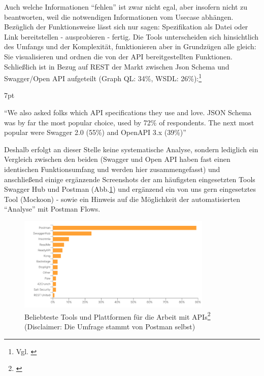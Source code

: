 \documentclass[notitlepage, hidelinks]{article}
\newenvironment{formal}{%
  \def\FrameCommand{%
    \hspace{1pt}%
    {\color{black}\vrule width 2pt}%
    {\color{formalshade}\vrule width 4pt}%
    \colorbox{formalshade}%
  }%
  \MakeFramed{\advance\hsize-\width\FrameRestore}%
  \noindent\hspace{-4.55pt}%
  \begin{adjustwidth}{}{7pt}%
  \vspace{2pt}\vspace{2pt}%
}
{%
  \vspace{2pt}\end{adjustwidth}\endMakeFramed%
}
\begin{document}
Auch welche Informationen ``fehlen'' ist zwar nicht egal, aber insofern nicht zu beantworten, weil die notwendigen Informationen vom Usecase abhängen. Bezüglich der Funktionsweise lässt sich nur sagen: Spezifikation als Datei oder Link bereitstellen - ausprobieren - fertig. Die Tools unterscheiden sich hinsichtlich des Umfangs und der Komplexität, funktionieren aber in Grundzügen alle gleich: Sie visualisieren und ordnen die von der API bereitgestellten Funktionen. Schließlich ist in Bezug auf REST der Markt zwischen Json Schema und Swagger/Open API aufgeteilt (Graph QL: 34\%, WSDL: 26\%):\footnote{Vgl. \cite{api-postman}}
\begin{formal}
``We also asked folks which API specifications they use and love. JSON Schema was by far the most popular choice, used by 72\% of respondents. The next most popular were Swagger 2.0 (55\%) and OpenAPI 3.x (39\%)''
\end{formal}

Deshalb erfolgt an dieser Stelle keine systematische Analyse, sondern lediglich ein Vergleich zwischen den beiden (Swagger und Open API haben fast einen identischen Funktionsumfang und werden hier zusammengefasst) und anschließend einige ergänzende Screenshots der am häufigsten eingesetzten Tools Swagger Hub und Postman (Abb.\ref{stateofapi2}) und ergänzend ein von uns gern eingesetztes Tool (Mockoon) - sowie ein Hinweis auf die Möglichkeit der automatisierten ``Analyse'' mit Postman Flows.


\begin{figure}[H]
\centering
  \includegraphics[width=350px]{images/stateofapi2.png}
  \caption{Beliebteste Tools und Plattformen für die Arbeit mit APIs\protect\footnote{\cite{api-postman}} (Disclaimer: Die Umfrage stammt von Postman selbst)}
  \label{stateofapi2}
\end{figure}
\end{document}
